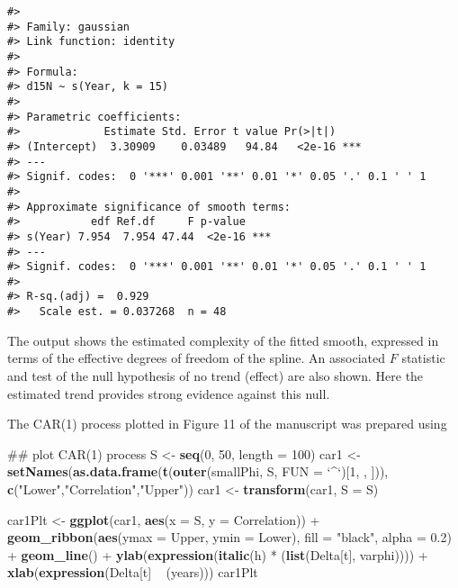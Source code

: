 \documentclass[12pt,]{article}
\newenvironment{Shaded}{\begin{snugshade}}{\end{snugshade}}
\newcommand{\KeywordTok}[1]{\textcolor[rgb]{0.13,0.29,0.53}{\textbf{{#1}}}}
\newcommand{\DataTypeTok}[1]{\textcolor[rgb]{0.13,0.29,0.53}{{#1}}}
\newcommand{\DecValTok}[1]{\textcolor[rgb]{0.00,0.00,0.81}{{#1}}}
\newcommand{\FloatTok}[1]{\textcolor[rgb]{0.00,0.00,0.81}{{#1}}}
\newcommand{\StringTok}[1]{\textcolor[rgb]{0.31,0.60,0.02}{{#1}}}
\newcommand{\NormalTok}[1]{{#1}}
\begin{document}
\begin{verbatim}
#> 
#> Family: gaussian 
#> Link function: identity 
#> 
#> Formula:
#> d15N ~ s(Year, k = 15)
#> 
#> Parametric coefficients:
#>             Estimate Std. Error t value Pr(>|t|)    
#> (Intercept)  3.30909    0.03489   94.84   <2e-16 ***
#> ---
#> Signif. codes:  0 '***' 0.001 '**' 0.01 '*' 0.05 '.' 0.1 ' ' 1
#> 
#> Approximate significance of smooth terms:
#>           edf Ref.df     F p-value    
#> s(Year) 7.954  7.954 47.44  <2e-16 ***
#> ---
#> Signif. codes:  0 '***' 0.001 '**' 0.01 '*' 0.05 '.' 0.1 ' ' 1
#> 
#> R-sq.(adj) =  0.929   
#>   Scale est. = 0.037268  n = 48
\end{verbatim}

The output shows the estimated complexity of the fitted smooth,
expressed in terms of the effective degrees of freedom of the spline. An
associated \(F\) statistic and test of the null hypothesis of no trend
(effect) are also shown. Here the estimated trend provides strong
evidence against this null.

The CAR(1) process plotted in Figure 11 of the manuscript was prepared
using

\begin{Shaded}
\begin{Highlighting}[]
\NormalTok{## plot CAR(1) process}
\NormalTok{S <-}\StringTok{ }\KeywordTok{seq}\NormalTok{(}\DecValTok{0}\NormalTok{, }\DecValTok{50}\NormalTok{, }\DataTypeTok{length =} \DecValTok{100}\NormalTok{)}
\NormalTok{car1 <-}\StringTok{ }\KeywordTok{setNames}\NormalTok{(}\KeywordTok{as.data.frame}\NormalTok{(}\KeywordTok{t}\NormalTok{(}\KeywordTok{outer}\NormalTok{(smallPhi, S, }\DataTypeTok{FUN =} \StringTok{`}\DataTypeTok{^}\StringTok{`}\NormalTok{)[}\DecValTok{1}\NormalTok{, , ])),}
                 \KeywordTok{c}\NormalTok{(}\StringTok{"Lower"}\NormalTok{,}\StringTok{"Correlation"}\NormalTok{,}\StringTok{"Upper"}\NormalTok{))}
\NormalTok{car1 <-}\StringTok{ }\KeywordTok{transform}\NormalTok{(car1, }\DataTypeTok{S =} \NormalTok{S)}

\NormalTok{car1Plt <-}\StringTok{ }\KeywordTok{ggplot}\NormalTok{(car1, }\KeywordTok{aes}\NormalTok{(}\DataTypeTok{x =} \NormalTok{S, }\DataTypeTok{y =} \NormalTok{Correlation)) +}
\StringTok{    }\KeywordTok{geom_ribbon}\NormalTok{(}\KeywordTok{aes}\NormalTok{(}\DataTypeTok{ymax =} \NormalTok{Upper, }\DataTypeTok{ymin =} \NormalTok{Lower),}
                \DataTypeTok{fill =} \StringTok{"black"}\NormalTok{, }\DataTypeTok{alpha =} \FloatTok{0.2}\NormalTok{) +}
\StringTok{    }\KeywordTok{geom_line}\NormalTok{() +}
\StringTok{    }\KeywordTok{ylab}\NormalTok{(}\KeywordTok{expression}\NormalTok{(}\KeywordTok{italic}\NormalTok{(h) *}\StringTok{ }\NormalTok{(}\KeywordTok{list}\NormalTok{(Delta[t], varphi)))) +}
\StringTok{    }\KeywordTok{xlab}\NormalTok{(}\KeywordTok{expression}\NormalTok{(Delta[t] ~}\StringTok{ }\NormalTok{(years)))}
\NormalTok{car1Plt}
\end{Highlighting}
\end{Shaded}
\end{document}
